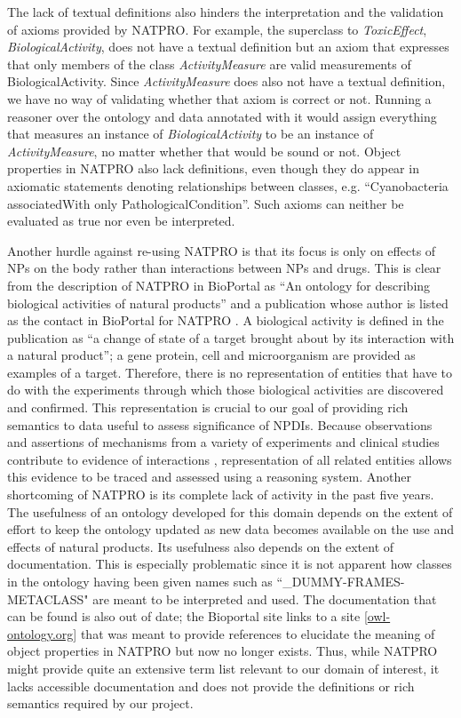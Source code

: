 \documentclass{bmcart}
\begin{document}
The lack of textual definitions also hinders the interpretation and the validation of axioms provided by NATPRO.
For example, the superclass to \textit{ToxicEffect}, \textit{BiologicalActivity}, does not have a textual definition but an axiom that expresses that only members of the class \textit{ActivityMeasure} are valid measurements of BiologicalActivity.
Since \textit{ActivityMeasure} does also not have a textual definition, we have no way of validating whether that axiom is correct or not.
Running a reasoner over the ontology and data annotated with it would assign everything that measures an instance of \textit{BiologicalActivity} to be an instance of \textit{ActivityMeasure}, no matter whether that would be sound or not.
Object properties in NATPRO also lack definitions, even though they do appear in axiomatic statements denoting relationships between classes, e.g. ``Cyanobacteria associatedWith only PathologicalCondition”.
Such axioms can neither be evaluated as true nor even be interpreted.

Another hurdle against re-using NATPRO is that its focus is only on effects of NPs on the body rather than interactions between NPs and drugs.
This is clear from the description of NATPRO in BioPortal as ``An ontology for describing biological activities of natural products'' and a publication whose author is listed as the contact in BioPortal for NATPRO \cite{Navarro}.
A biological activity is defined in the publication as ``a change of state of a target brought about by its interaction with a natural product”; a gene protein, cell and microorganism are provided as examples of a target.
Therefore, there is no representation of entities that have to do with the experiments through which those biological activities are discovered and confirmed.
This representation is crucial to our goal of providing rich semantics to data useful to assess significance of NPDIs.
Because observations and assertions of mechanisms from a variety of experiments and clinical studies contribute to evidence of interactions \cite{Brochhausen}, representation of all related entities allows this evidence to be traced and assessed using a reasoning system.
Another shortcoming of NATPRO is its complete lack of activity in the past five years.
The usefulness of an ontology developed for this domain depends on the extent of effort to keep the ontology updated as new data becomes available on the use and effects of natural products.
Its usefulness also depends on the extent of documentation.
This is especially problematic since it is not apparent how classes in the ontology having been given names such as ``\_DUMMY-FRAMES-METACLASS" are meant to be interpreted and used. The documentation that can be found is also out of date; the Bioportal site links to a site [\url{owl-ontology.org}] that was meant to provide references to elucidate the meaning of object properties in NATPRO but now no longer exists.
Thus, while NATPRO might provide quite an extensive term list relevant to our domain of interest, it lacks accessible documentation and does not provide the definitions or rich semantics required by our project.
\end{document}
